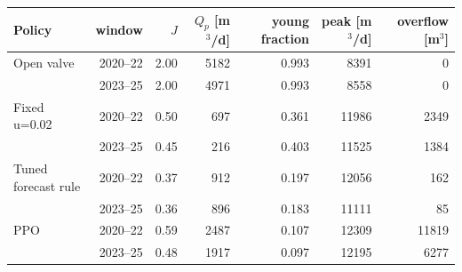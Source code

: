 \begin{tabular}{lrrrrrr}
\toprule
Policy & window & $J$ & $Q_p$ [m$^3$/d] & young fraction & peak [m$^3$/d] & overflow [m$^3$] \\
\midrule
Open valve & 2020--22 & 2.00 & 5182 & 0.993 & 8391 & 0 \\
 & 2023--25 & 2.00 & 4971 & 0.993 & 8558 & 0 \\
Fixed u=0.02 & 2020--22 & 0.50 & 697 & 0.361 & 11986 & 2349 \\
 & 2023--25 & 0.45 & 216 & 0.403 & 11525 & 1384 \\
Tuned forecast rule & 2020--22 & 0.37 & 912 & 0.197 & 12056 & 162 \\
 & 2023--25 & 0.36 & 896 & 0.183 & 11111 & 85 \\
PPO & 2020--22 & 0.59 & 2487 & 0.107 & 12309 & 11819 \\
 & 2023--25 & 0.48 & 1917 & 0.097 & 12195 & 6277 \\
\bottomrule
\end{tabular}

